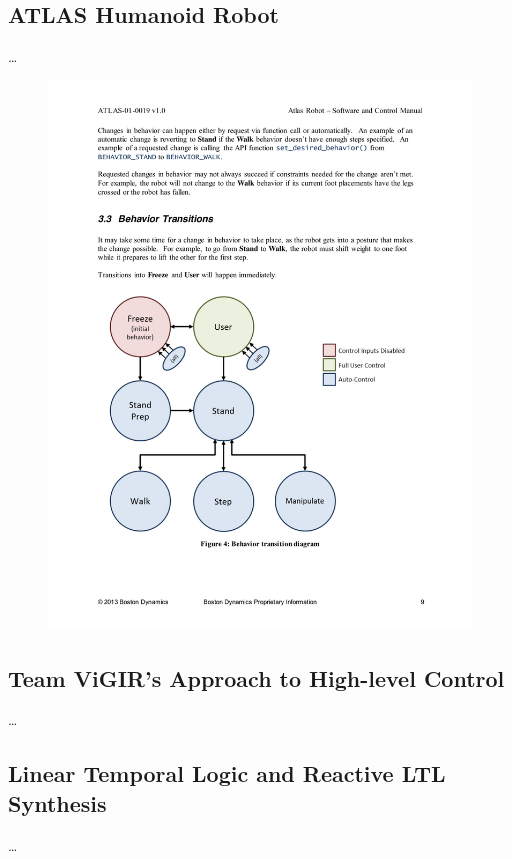 
\subsection{ATLAS Humanoid Robot}

\ldots

\begin{figure}[t]
\centering
\includegraphics[width=0.95\columnwidth,clip]{./img/control_modes_ts.pdf}
\caption{
}
\label{Fig:ControlModeTS}
\end{figure}

\subsection{Team ViGIR's Approach to High-level Control}

\ldots

\subsection{Linear Temporal Logic and Reactive LTL Synthesis}

\ldots